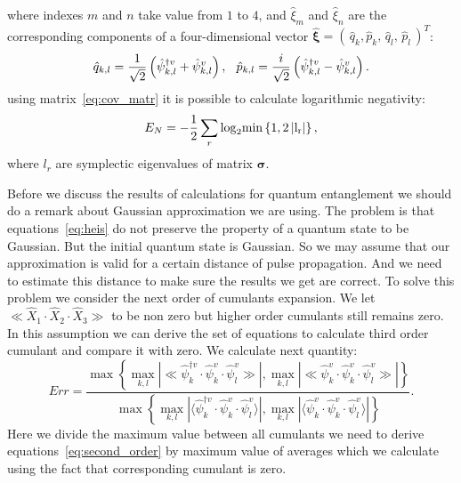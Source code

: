 \documentclass[9pt,twocolumn,twoside]{osajnl}
\begin{document}
where indexes $m$ and $n$ take value from $1$ to $4$, and $\hat{\xi}_{m}$ and $\hat{\xi}_{n}$ are the corresponding components of a four-dimensional vector $\hat{\bm{\xi}}=\left(\,\hat{q}_{k},\hat{p}_{k},\,\hat{q}_{l},\,\hat{p}_{l}\,\right)^{T}$:
\begin{equation}\label{eq:qp}
	\hat{q}_{k,l}=\frac{1}{\sqrt{2}}\left(\hat{\psi}^{\dag v}_{k,l}+\hat{\psi}^{v}_{k,l}\right),\hspace{2.5mm}\hat{p}_{k,l}=\frac{i}{\sqrt{2}}\left(\hat{\psi}^{\dag v}_{k,l}-\hat{\psi}^{v}_{k,l}\right).
\end{equation}
using matrix~\eqref{eq:cov_matr} it is possible to calculate logarithmic negativity:
\begin{equation}\label{eq:EN}
	E_N = -\dfrac{1}{2}\sum_r \rm{log}_2 \rm{min}\left\{1, 2\left|l_r\right|\right\},
\end{equation}
where $l_r$ are symplectic eigenvalues of matrix $\bm{\sigma}$.
\par
Before we discuss the results of calculations for quantum entanglement we should do a remark about Gaussian approximation we are using. 
The problem is that equations~\eqref{eq:heis} do not preserve the property of a quantum state to be Gaussian. 
But the initial quantum state is Gaussian. 
So we may assume that our approximation is valid for a certain distance of pulse propagation. 
And we need to estimate this distance to make sure the results we get are correct.
To solve this problem we consider the next order of cumulants expansion. 
We let $\ll\hat{X}_1\cdot\hat{X}_2\cdot\hat{X}_3\gg$ to be non zero but higher order cumulants still remains zero.
In this assumption we can derive the set of equations to calculate third order cumulant and compare it with zero.
We calculate next quantity:
\begin{equation}
Err \!= \!\!\dfrac{\max\!\left\{\underset{k,l}{\max}\!\left|\ll\!\hat{\psi}^{\dag v}_{k}\!\cdot\!\hat{\psi}^{ v}_{k}\!\cdot\!\hat{\psi}^{ v}_{l}\!\!\gg\right|\!,\underset{k,l}{\max}\!\left|\ll\!\hat{\psi}^{ v}_{k}\!\cdot\!\hat{\psi}^{ v}_{k}\!\cdot\!\hat{\psi}^{ v}_{l}\!\!\gg\right|\right\}}
{\max\left\{\underset{k,l}{\max}\left|\langle\hat{\psi}^{\dag v}_{k}\!\cdot\!\hat{\psi}^{ v}_{k}\!\cdot\!\hat{\psi}^{ v}_{l}\rangle\right|,\underset{k,l}{\max}\left|\langle\hat{\psi}^{ v}_{k}\!\cdot\!\hat{\psi}^{ v}_{k}\!\cdot\!\hat{\psi}^{ v}_{l}\rangle\right|\right\}}\!.
\end{equation}
Here we divide the maximum value between all cumulants we need to derive equations~\eqref{eq:second_order} by maximum value of averages which we calculate using the fact that corresponding cumulant is zero.
\end{document}
